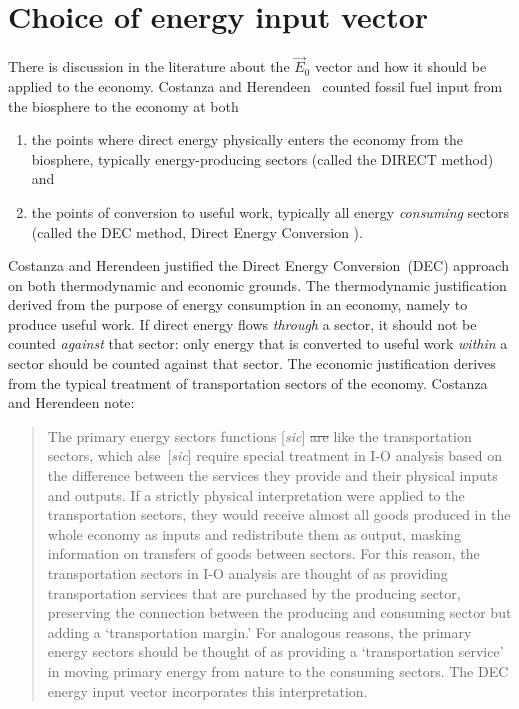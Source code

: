 \section{Choice of energy input vector}
\label{sec:energy_input_vector}


There is discussion in the literature about the $\vec{E}_{0}$
vector and how it should be applied to the economy.
Costanza and Herendeen~\cite{Costanza:1984tq} counted fossil fuel input 
from the biosphere to the economy
at both 
\begin{enumerate}
	\item 	
		the points where direct energy physically 
		enters the economy from the biosphere, 
		typically energy-producing sectors
		(called the DIRECT method) and
	\item 
		the points of conversion to useful work, 
		typically all energy \emph{consuming} sectors
		(called the DEC method, 
		Direct Energy Conversion
		).
\end{enumerate}
Costanza and Herendeen justified the Direct Energy Conversion~(DEC) 
approach on both thermodynamic and economic grounds. 
The thermodynamic justification derived from the purpose 
of energy consumption in an economy, 
namely to produce useful work. 
If direct energy flows \emph{through} a sector, 
it should not be counted \emph{against} that sector: 
only energy that is converted to useful work \emph{within} 
a sector should be counted against that sector.
The economic justification derives 
from the typical treatment of transportation sectors of the economy.
Costanza and Herendeen note:

\begin{quote}
	The primary energy sectors functions [\emph{sic}] \sout{are}
	like the transportation sectors, 
	which alse~[\emph{sic}] require special treatment in I-O analysis 
	based on the difference between the services they provide 
	and their physical inputs and outputs. 
	If a strictly physical interpretation were applied to the 
	transportation sectors, 
	they would receive almost all goods produced in the whole economy as inputs 
	and redistribute them as output, 
	masking information on transfers of goods between sectors. 
	For this reason, the transportation sectors in I-O analysis 
	are thought of as providing transportation services 
	that are purchased by the producing sector, 
	preserving the connection between the producing and consuming sector 
	but adding a `transportation margin.' 
	For analogous reasons, 
	the primary energy sectors should be thought of as providing a 
	`transportation service' in moving primary energy 
	from nature to the consuming sectors. 
	The DEC energy input vector incorporates this interpretation.\cite[p. 151]{Costanza:1984tq}
\end{quote}

